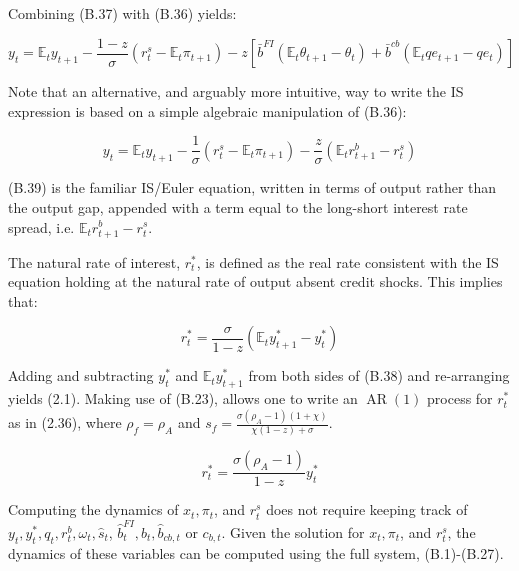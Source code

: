 \documentclass[10pt]{article}
\begin{document}
Combining (B.37) with (B.36) yields:

\begin{equation*}
y_{t}=\mathbb{E}_{t} y_{t+1}-\frac{1-z}{\sigma}\left(r_{t}^{s}-\mathbb{E}_{t} \pi_{t+1}\right)-z\left[\bar{b}^{F I}\left(\mathbb{E}_{t} \theta_{t+1}-\theta_{t}\right)+\bar{b}^{c b}\left(\mathbb{E}_{t} q e_{t+1}-q e_{t}\right)\right] \tag{B.38}
\end{equation*}

Note that an alternative, and arguably more intuitive, way to write the IS expression is based on a simple algebraic manipulation of (B.36):

\begin{equation*}
y_{t}=\mathbb{E}_{t} y_{t+1}-\frac{1}{\sigma}\left(r_{t}^{s}-\mathbb{E}_{t} \pi_{t+1}\right)-\frac{z}{\sigma}\left(\mathbb{E}_{t} r_{t+1}^{b}-r_{t}^{s}\right) \tag{B.39}
\end{equation*}

(B.39) is the familiar IS/Euler equation, written in terms of output rather than the output gap, appended with a term equal to the long-short interest rate spread, i.e. $\mathbb{E}_{t} r_{t+1}^{b}-r_{t}^{s}$.

The natural rate of interest, $r_{t}^{*}$, is defined as the real rate consistent with the IS equation holding at the natural rate of output absent credit shocks. This implies that:

\begin{equation*}
r_{t}^{*}=\frac{\sigma}{1-z}\left(\mathbb{E}_{t} y_{t+1}^{*}-y_{t}^{*}\right) \tag{B.40}
\end{equation*}

Adding and subtracting $y_{t}^{*}$ and $\mathbb{E}_{t} y_{t+1}^{*}$ from both sides of (B.38) and re-arranging yields (2.1). Making use of (B.23), allows one to write an $\operatorname{AR}(1)$ process for $r_{t}^{*}$ as in (2.36), where $\rho_{f}=\rho_{A}$ and $s_{f}=\frac{\sigma\left(\rho_{A}-1\right)(1+\chi)}{\chi(1-z)+\sigma}$.

\begin{equation*}
r_{t}^{*}=\frac{\sigma\left(\rho_{A}-1\right)}{1-z} y_{t}^{*} \tag{B.41}
\end{equation*}

Computing the dynamics of $x_{t}, \pi_{t}$, and $r_{t}^{s}$ does not require keeping track of $y_{t}, y_{t}^{*}, q_{t}, r_{t}^{b}, \omega_{t}, \widehat{s}_{t}$, $\widehat{b}_{t}^{F I}, \widehat{b}_{t}, \widehat{b}_{c b, t}$ or $c_{b, t}$. Given the solution for $x_{t}, \pi_{t}$, and $r_{t}^{s}$, the dynamics of these variables can be computed using the full system, (B.1)-(B.27).
\end{document}
